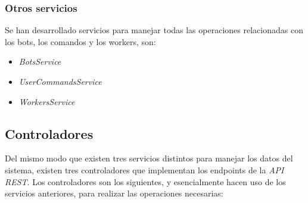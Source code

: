 \subsubsection{Otros servicios}

Se han desarrollado servicios para manejar todas las operaciones relacionadas con los bots, los comandos y los workers, son:

\begin{itemize}
	\item \textit{BotsService}
	\item \textit{UserCommandsService} 
	\item \textit{WorkersService} 
\end{itemize}

\subsection{Controladores}

Del mismo modo que existen tres servicios distintos para manejar los datos del sistema, existen tres controladores que implementan los endpoints de la \textit{API REST}. Los controladores son los siguientes, y esencialmente hacen uso de los servicios anteriores, para realizar las operaciones necesarias:

